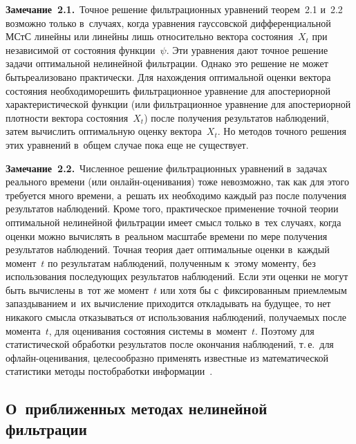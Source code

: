 \begin{multicols}{2}
\noindent
\textbf{Замечание~2.1.}\
Точное решение фильтрационных уравнений теорем~2.1 и~2.2  возможно
только в~случаях, когда уравнения гауссовской дифференциальной МСтС
линейны или линейны лишь относительно вектора состояния~$X_t$ при
независимой от состояния функции~$\psi$. Эти уравнения
 дают точ\-ное решение задачи оптимальной нелинейной фильтрации.  Однако это решение
  не может быть\linebreak реали\-зовано практически. Для
 нахождения оптимальной оценки вектора состояния необходимо\linebreak решить
 фильтрационное уравнение  для апостериорной характеристической функции
 (или  фильтрационное уравнение  для апостериорной плотности   вектора
 состояния~$X_t$) после получения результатов наблюдений, затем вычислить 
 оптимальную оценку вектора~$X_t$. Но методов точного решения этих
 уравнений  в~общем случае пока еще не существует.
 
 \vspace{3pt}
 
 \noindent
\textbf{Замечание~2.2.}\
 Численное решение фильтрационных уравнений в~задачах реального 
 времени (или он\-лайн-оце\-ни\-ва\-ния) тоже
 невозможно, так как для этого требуется много времени, а~решать их
 необходимо каждый раз после получения результатов наблю\-де\-ний.
 Кроме того, практическое применение точной теории оптимальной нелинейной фильтрации
 имеет смысл только в~тех случаях, когда оценки можно вычислять 
 в~реальном масштабе времени по мере получения результатов
 наблюдений. Точная теория дает оптимальные
 оценки в~каждый момент~$t$ по результатам наблюдений, полученным
 к~этому моменту, без использования последующих результатов
 наблюдений. Если эти оценки не могут быть вычислены в~тот же
 момент~$t$ или хотя бы с~фиксированным приемлемым запаздыванием
 и~их вычисление приходится откладывать на будущее, то нет
 никакого смысла отказываться от использования наблюдений,
 получаемых после момента~$t$, для оценивания состояния системы в~момент~$t$. 
 Поэтому для статистической обработки результатов
 после окончания наблюдений, т.\,е.\ для оф\-лайн-оце\-ни\-ва\-ния,
 целесообразно применять известные из математической статистики методы
 постобработки информации~\cite{5-s1}.
 
 \vspace*{-6pt}

\subsection{О~приближенных методах нелинейной фильтрации}


\end{multicols}
